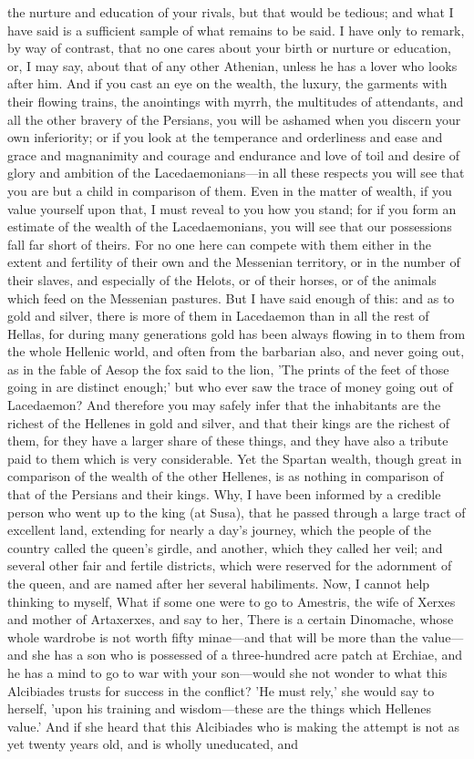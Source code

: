 \documentclass[11pt,letter]{article}
\begin{document}
the nurture and education of your rivals, but that would be tedious; and what I have said is a sufficient sample of what remains to be said. I have only to remark, by way of contrast, that no one cares about your birth or nurture or education, or, I may say, about that of any other Athenian, unless he has a lover who looks after him. And if you cast an eye on the wealth, the luxury, the garments with their flowing trains, the anointings with myrrh, the multitudes of attendants, and all the other bravery of the Persians, you will be ashamed when you discern your own inferiority; or if you look at the temperance and orderliness and ease and grace and magnanimity and courage and endurance and love of toil and desire of glory and ambition of the Lacedaemonians—in all these respects you will see that you are but a child in comparison of them. Even in the matter of wealth, if you value yourself upon that, I must reveal to you how you stand; for if you form an estimate of the wealth of the Lacedaemonians, you will see that our possessions fall far short of theirs. For no one here can compete with them either in the extent and fertility of their own and the Messenian territory, or in the number of their slaves, and especially of the Helots, or of their horses, or of the animals which feed on the Messenian pastures. But I have said enough of this:  and as to gold and silver, there is more of them in Lacedaemon than in all the rest of Hellas, for during many generations gold has been always flowing in to them from the whole Hellenic world, and often from the barbarian also, and never going out, as in the fable of Aesop the fox said to the lion, 'The prints of the feet of those going in are distinct enough;' but who ever saw the trace of money going out of Lacedaemon? And therefore you may safely infer that the inhabitants are the richest of the Hellenes in gold and silver, and that their kings are the richest of them, for they have a larger share of these things, and they have also a tribute paid to them which is very considerable. Yet the Spartan wealth, though great in comparison of the wealth of the other Hellenes, is as nothing in comparison of that of the Persians and their kings. Why, I have been informed by a credible person who went up to the king (at Susa), that he passed through a large tract of excellent land, extending for nearly a day's journey, which the people of the country called the queen's girdle, and another, which they called her veil; and several other fair and fertile districts, which were reserved for the adornment of the queen, and are named after her several habiliments. Now, I cannot help thinking to myself, What if some one were to go to Amestris, the wife of Xerxes and mother of Artaxerxes, and say to her, There is a certain Dinomache, whose whole wardrobe is not worth fifty minae—and that will be more than the value—and she has a son who is possessed of a three-hundred acre patch at Erchiae, and he has a mind to go to war with your son—would she not wonder to what this Alcibiades trusts for success in the conflict? 'He must rely,' she would say to herself, 'upon his training and wisdom—these are the things which Hellenes value.' And if she heard that this Alcibiades who is making the attempt is not as yet twenty years old, and is wholly uneducated, and 
\end{document}
